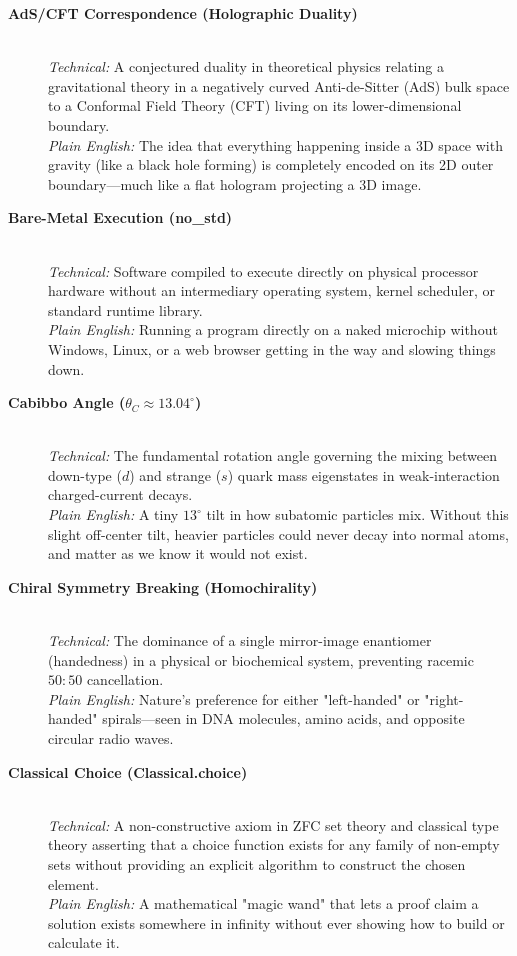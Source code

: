 \documentclass[11pt,a4paper,oneside]{article}
\def\texttt#1{#1}%
\theoremstyle{definition}
\begin{document}
\begin{description}
    \item[\textbf{AdS/CFT Correspondence (Holographic Duality)}] \hfill \\
    \textit{Technical:} A conjectured duality in theoretical physics relating a gravitational theory in a negatively curved Anti-de-Sitter (AdS) bulk space to a Conformal Field Theory (CFT) living on its lower-dimensional boundary. \\
    \textit{Plain English:} The idea that everything happening inside a 3D space with gravity (like a black hole forming) is completely encoded on its 2D outer boundary—much like a flat hologram projecting a 3D image.

    \item[\textbf{Bare-Metal Execution (\texttt{no\_std})}] \hfill \\
    \textit{Technical:} Software compiled to execute directly on physical processor hardware without an intermediary operating system, kernel scheduler, or standard runtime library. \\
    \textit{Plain English:} Running a program directly on a naked microchip without Windows, Linux, or a web browser getting in the way and slowing things down.

    \item[\textbf{Cabibbo Angle ($\theta_C \approx 13.04^\circ$)}] \hfill \\
    \textit{Technical:} The fundamental rotation angle governing the mixing between down-type ($d$) and strange ($s$) quark mass eigenstates in weak-interaction charged-current decays. \\
    \textit{Plain English:} A tiny $13^\circ$ tilt in how subatomic particles mix. Without this slight off-center tilt, heavier particles could never decay into normal atoms, and matter as we know it would not exist.

    \item[\textbf{Chiral Symmetry Breaking (Homochirality)}] \hfill \\
    \textit{Technical:} The dominance of a single mirror-image enantiomer (handedness) in a physical or biochemical system, preventing racemic $50:50$ cancellation. \\
    \textit{Plain English:} Nature's preference for either "left-handed" or "right-handed" spirals—seen in DNA molecules, amino acids, and opposite circular radio waves.

    \item[\textbf{Classical Choice (\texttt{Classical.choice})}] \hfill \\
    \textit{Technical:} A non-constructive axiom in ZFC set theory and classical type theory asserting that a choice function exists for any family of non-empty sets without providing an explicit algorithm to construct the chosen element. \\
    \textit{Plain English:} A mathematical "magic wand" that lets a proof claim a solution exists somewhere in infinity without ever showing how to build or calculate it.


\end{description}
\end{document}

